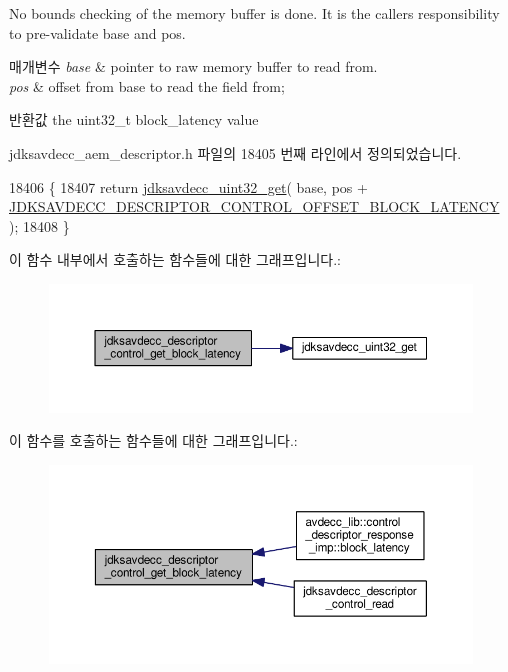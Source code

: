 No bounds checking of the memory buffer is done. It is the caller\textquotesingle{}s responsibility to pre-\/validate base and pos.


\begin{DoxyParams}{매개변수}
{\em base} & pointer to raw memory buffer to read from. \\
\hline
{\em pos} & offset from base to read the field from; \\
\hline
\end{DoxyParams}
\begin{DoxyReturn}{반환값}
the uint32\+\_\+t block\+\_\+latency value 
\end{DoxyReturn}


jdksavdecc\+\_\+aem\+\_\+descriptor.\+h 파일의 18405 번째 라인에서 정의되었습니다.


\begin{DoxyCode}
18406 \{
18407     \textcolor{keywordflow}{return} \hyperlink{group__endian_gaefcf5bd4f368997a82f358ab89052d6b}{jdksavdecc\_uint32\_get}( base, pos + 
      \hyperlink{group__descriptor__control_gabb678c0104ddf1fb7fb7d820696183aa}{JDKSAVDECC\_DESCRIPTOR\_CONTROL\_OFFSET\_BLOCK\_LATENCY} );
18408 \}
\end{DoxyCode}


이 함수 내부에서 호출하는 함수들에 대한 그래프입니다.\+:
\nopagebreak
\begin{figure}[H]
\begin{center}
\leavevmode
\includegraphics[width=350pt]{group__descriptor__control_ga76ad41a544a93c25d3228b85da67e1a7_cgraph}
\end{center}
\end{figure}




이 함수를 호출하는 함수들에 대한 그래프입니다.\+:
\nopagebreak
\begin{figure}[H]
\begin{center}
\leavevmode
\includegraphics[width=350pt]{group__descriptor__control_ga76ad41a544a93c25d3228b85da67e1a7_icgraph}
\end{center}
\end{figure}


